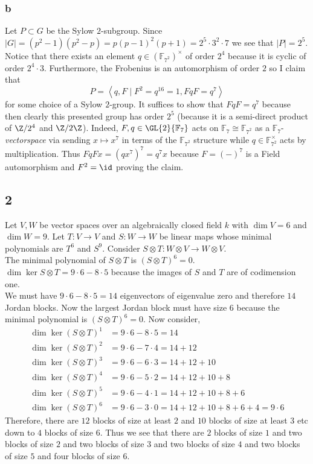 \documentclass[12pt]{article}
\begin{document}
\subsubsection{b}

Let $P \subset G$ be the Sylow $2$-subgroup. Since $|G| = (p^2 - 1)(p^2 - p) = p(p-1)^2(p+1) = 2^5 \cdot 3^2 \cdot 7$ we see that $|P| = 2^5$. Notice that there exists an element $q \in (\mathbb{F}_{7^2})^\times$ of order $2^4$ because it is cyclic of order $2^4 \cdot 3$. Furthermore, the Frobenius is an automorphism of order $2$ so I claim that 
\[ P = \left< q, F \mid F^2 = q^{16} = 1, F q F = q^7 \right> \]
for some choice of a Sylow $2$-group. It suffices to show that $F q F = q^7$ because then clearly this presented group has order $2^5$ (because it is a semi-direct product of $\Z / 2^4$ and $\Z / 2 \Z$). Indeed, $F, q \in \GL{2}{\mathbb{F}_7}$ acts on $\mathbb{F}_7 \cong \mathbb{F}_{7^2}$ as a $\mathbb{F}_7$-\textit{vectorspace} via sending $x \mapsto x^7$ in terms of the $\mathbb{F}_{7^2}$ structure while $q \in \mathbb{F}_{7^2}^\times$ acts by multiplication. Thus $F q F x = (q x^7)^7 = q^7 x$ because $F = (-)^7$ is a Field automorphism and $F^2 = \id$ proving the claim.

\subsection{2}

Let $V,W$ be vector spaces over an algebraically closed field $k$ with $\dim{V} = 6$ and $\dim{W} = 9$. Let $T : V \to V$ and $S : W \to W$ be linear maps whose minimal polynomials are $T^6$ and $S^9$. Consider $S \otimes T : W \otimes V \to W \otimes V$.
\bigskip\\
The minimal polynomial of $S \otimes T$ is $(S \otimes T)^{6} = 0$.
\bigskip\\
$\dim{\ker{S \otimes T}} = 9 \cdot 6 - 8 \cdot 5$ because the images of $S$ and $T$ are of codimension one.
\bigskip\\
We must have $9 \cdot 6 - 8 \cdot 5 = 14$ eigenvectors of eigenvalue zero and therefore $14$ Jordan blocks. Now the largest Jordan block must have size $6$ because the minimal polynomial is $(S \otimes T)^6 = 0$. Now consider,
\begin{align*}
\dim{\ker{(S \otimes T)^1}} & = 9 \cdot 6 - 8 \cdot 5 = 14
\\
\dim{\ker{(S \otimes T)^2}} & = 9 \cdot 6 - 7 \cdot 4 = 14 + 12
\\
\dim{\ker{(S \otimes T)^3}} & = 9 \cdot 6 - 6 \cdot 3 = 14 + 12 + 10
\\
\dim{\ker{(S \otimes T)^4}} & = 9 \cdot 6 - 5 \cdot 2 = 14 + 12 + 10 + 8
\\
\dim{\ker{(S \otimes T)^5}} & = 9 \cdot 6 - 4 \cdot 1 = 14 + 12 + 10 + 8 + 6
\\
\dim{\ker{(S \otimes T)^6}} & = 9 \cdot 6 - 3 \cdot 0 = 14 + 12 + 10 + 8 + 6 + 4 = 9 \cdot 6
\end{align*}
Therefore, there are $12$ blocks of size at least $2$ and $10$ blocks of size at least $3$ etc down to $4$ blocks of size $6$. Thus we see that there are $2$ blocks of size $1$ and two blocks of size $2$ and two blocks of size $3$ and two blocks of size $4$ and two blocks of size $5$ and four blocks of size $6$.
\end{document}
